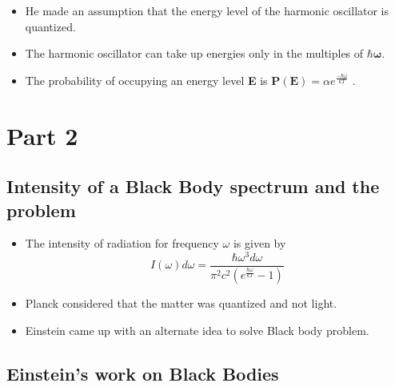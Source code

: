 \documentclass[aspectratio=169]{beamer}
\begin{document}
\begin{frame}{}

	\begin{itemize}

		\item He made an assumption that the energy level of the harmonic oscillator is quantized.  \newline
		\item The harmonic oscillator can take up energies only in the multiples of $ \mathbf{\hbar \omega} $.  \newline
		\item The probability of occupying an energy level \textbf{E} is {\large $\mathbf{P(E)} = \alpha e^{\frac{-\hbar \omega}{kT}}$} . 
	\end{itemize}
	
\end{frame}

\section{Part 2}

\subsection{Intensity of a Black Body spectrum and the problem}

\begin{frame}{}

	\begin{itemize}

		\item The intensity of radiation for frequency $\omega$ is given by \[I(\omega)d\omega = \frac{\hbar \omega^3 d\omega}{ \pi^2 c^2 \left(e^{\frac{\hbar \omega}{kT}}-1 \right) } \] \newline
		\item Planck considered that the matter was quantized and not light. \newline
		\item Einstein came up with an alternate idea to solve Black body problem.
		 
	\end{itemize}
	
\end{frame}

\subsection{Einstein's work on Black Bodies}
\end{document}
